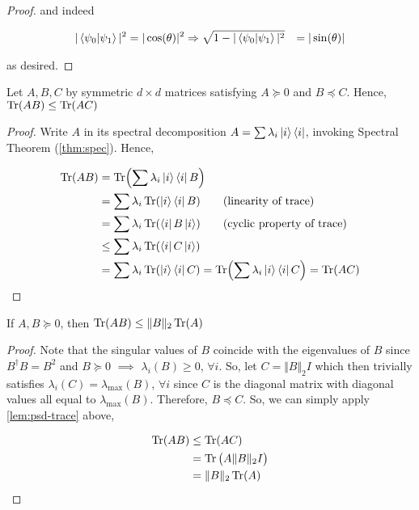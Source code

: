 \documentclass[main.tex]{subfiles}
\begin{document}
\begin{subappendices}
\begin{proof}
and indeed 

\begin{align*}
|\bra{\psi_0}\ket{\psi_1}|^2 &= |\cos(\theta)|^2
\Rightarrow \sqrt{1 - |\bra{\psi_0}\ket{\psi_1}|^2} &= |\sin(\theta)|
\end{align*}

as desired.
\end{proof}


\begin{lemma}
\label{lem:psd-trace}
Let $A, B, C$ by symmetric $d \times d$ matrices satisfying $A \succeq 0$ and $B \preceq C$. Hence, $\Tr(AB) \leq \Tr(AC)$

\begin{proof}
	Write $A$ in its spectral decomposition $A = \sum \lambda_i \ket{i}\bra{i}$, invoking Spectral Theorem (\ref{thm:spec}). Hence,
	
	\begin{align*}
		\Tr(AB) &= \Tr(\sum \lambda_i \ket{i}\bra{i} B)\\
		&= \sum \lambda_i \Tr(\ket{i}\bra{i} B) \tag{linearity of trace}\\
		&= \sum \lambda_i \Tr(\bra{i} B \ket{i}) \tag{cyclic property of trace}\\
		&\leq \sum \lambda_i \Tr(\bra{i} C \ket{i})\\
		&= \sum \lambda_i \Tr(\ket{i}\bra{i} C) = \Tr(\sum \lambda_i \ket{i}\bra{i} C) = \Tr(AC)
	\end{align*}
\end{proof}
\end{lemma}

\begin{corollary}
\label{cor:psd-tr-norm-ineq}
If $A, B \succeq 0$, then $\Tr(AB) \leq \Vert B \Vert_2 \Tr(A)$

\begin{proof}
Note that the singular values of $B$ coincide with the eigenvalues of $B$ since $B^\dag B = B^2$ and $B \succeq 0$ $\implies$ $\lambda_i(B) \geq 0$, $\forall i$. So, let $C = \Vert B \Vert_2 I$ which then trivially satisfies $\lambda_i(C) = \lambda_{\max}(B)$, $\forall i$ since $C$ is the diagonal matrix with diagonal values all equal to $\lambda_{\max}(B)$. Therefore, $B \preceq C$. So, we can simply apply \ref{lem:psd-trace} above,

\begin{align*}
\Tr(AB) &\leq \Tr(AC) \\
&= \Tr\big(A \Vert B \Vert_2 I\big)\\
&= \Vert B \Vert_2 \Tr(A)
\end{align*}
\end{proof}
\end{corollary}


\end{subappendices}
\end{document}
